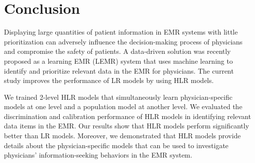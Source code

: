 \section{Conclusion}\label{sec:conclusion}
Displaying large quantities of patient information in EMR systems with little prioritization can adversely influence the decision-making process of physicians and compromise the safety of patients. A data-driven solution was recently proposed as a learning EMR (LEMR) system that uses machine learning to identify and prioritize relevant data in the EMR for physicians. The current study improves the performance of LR models by using HLR models.

We trained 2-level HLR models that simultaneously learn physician-specific models at one level and a population model at another level. We evaluated the discrimination and calibration performance of HLR models in identifying relevant data items in the EMR. Our results show that HLR models perform significantly better than LR models. Moreover, we demonstrated that HLR models provide details about the physician-specific models that can be used to investigate physicians’ information-seeking behaviors in the EMR system.

